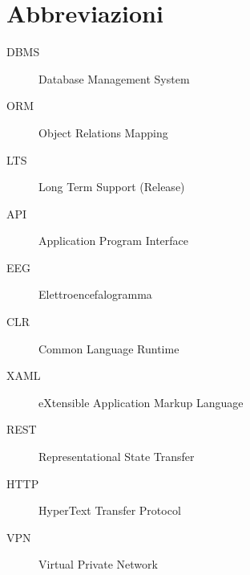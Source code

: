 \documentclass[\main/main.tex]{subfiles}
\begin{document}
\chapter*{Abbreviazioni}

\begin{description}
    \item[DBMS] Database Management System
    \item[ORM] Object Relations Mapping
    \item[LTS] Long Term Support (Release)
    \item[API] Application Program Interface  
    \item[EEG] Elettroencefalogramma  
    \item[CLR] Common Language Runtime 
    \item[XAML] eXtensible Application Markup Language 
    \item[REST] Representational State Transfer
    \item[HTTP] HyperText Transfer Protocol 
    \item[VPN] Virtual Private Network
\end{description}
\end{document}
